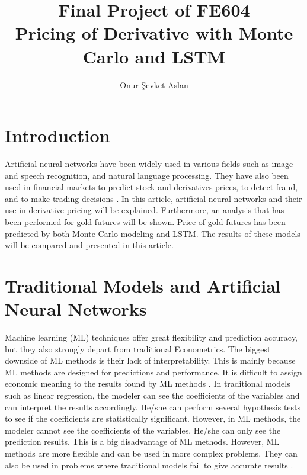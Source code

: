 \documentclass[12pt, a4paper]{article}
\title{Final Project of FE604 \\ Pricing of Derivative with Monte Carlo and LSTM}
\author{Onur Şevket Aslan}
\begin{document}
\maketitle

\newpage
\tableofcontents

\newpage
\section{Introduction}
Artificial neural networks have been widely used in various fields such as image and speech recognition, and natural language processing.  They have also been used in financial markets to predict stock and derivatives prices, to detect fraud, and to make trading decisions \cite{4}.  In this article, artificial neural networks and their use in derivative pricing will be explained.  Furthermore, an analysis that has been performed for gold futures will be shown.  Price of gold futures has been predicted by both Monte Carlo modeling and LSTM.  The results of these models will be compared and presented in this article.\\[\baselineskip]


\section{Traditional Models and Artificial Neural Networks}
Machine learning (ML) techniques offer great flexibility and prediction accuracy, but they also strongly depart from traditional Econometrics.  The biggest downside of ML methods is their lack of interpretability.  This is mainly because ML methods are designed for predictions and performance.  It is difficult to assign economic meaning to the results found by ML methods \cite{3}.  In traditional models such as linear regression, the modeler can see the coefficients of the variables and can interpret the results accordingly.  He/she can perform several hypothesis tests to see if the coefficients are statistically significant.  However, in ML methods, the modeler cannot see the coefficients of the variables.  He/she can only see the prediction results.  This is a big disadvantage of ML methods.  However, ML methods are more flexible and can be used in more complex problems.  They can also be used in problems where traditional models fail to give accurate results \cite{3}.\\[\baselineskip] 
\end{document}
